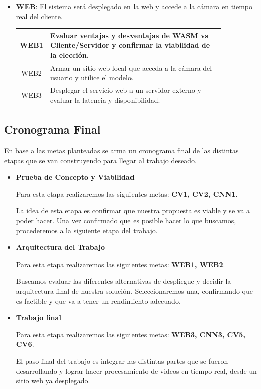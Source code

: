 \documentclass[a4paper]{article}
\begin{document}
\begin{itemize}
\item \textbf{WEB}: El sistema será desplegado en la web y accede a la cámara en tiempo real del cliente.

\begin{center}
\begin{tabular}{c m{0.85\linewidth}} \toprule
    WEB1 & Evaluar ventajas y desventajas de WASM vs Cliente/Servidor y confirmar la viabilidad de la elección. \\ \midrule
    WEB2 & Armar un sitio web local que acceda a la cámara del usuario y utilice el modelo. \\ \midrule
    WEB3 & Desplegar el servicio web a un servidor externo y evaluar la latencia y disponibilidad. \\ \bottomrule
\end{tabular}
\end{center}
\end{itemize}

\subsection{Cronograma Final}

En base a las metas planteadas se arma un cronograma final de las distintas etapas que se van construyendo para llegar al trabajo deseado.

\begin{itemize}
\item \textbf{Prueba de Concepto y Viabilidad}

Para esta etapa realizaremos las siguientes metas: \textbf{CV1, CV2, CNN1}.

La idea de esta etapa es confirmar que nuestra propuesta es viable y se va a poder hacer. Una vez confirmado que es posible hacer lo que buscamos, procederemos a la siguiente etapa del trabajo.

\item \textbf{Arquitectura del Trabajo}

Para esta etapa realizaremos las siguientes metas: \textbf{WEB1, WEB2}.

Buscamos evaluar las diferentes alternativas de despliegue y decidir la arquitectura final de nuestra solución.
Seleccionaremos una, confirmando que es factible y que va a tener un rendimiento adecuado.

\item \textbf{Trabajo final}

Para esta etapa realizaremos las siguientes metas: \textbf{WEB3, CNN3, CV5, CV6}.

El paso final del trabajo es integrar las distintas partes que se fueron desarrollando y lograr hacer procesamiento de videos en tiempo real, desde un sitio web ya desplegado.

\end{itemize}
\end{document}
